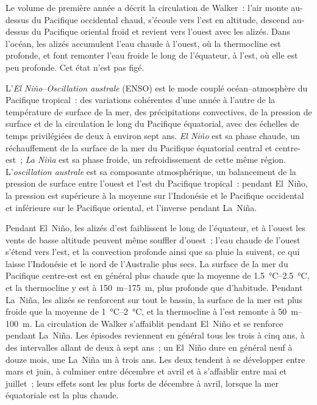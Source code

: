 Le volume de première année a décrit la circulation de Walker~: l'air monte au-dessus du Pacifique occidental
chaud, s'écoule vers l'est en altitude, descend au-dessus du Pacifique oriental froid et revient vers l'ouest
avec les alizés. Dans l'océan, les alizés accumulent l'eau chaude à l'ouest, où la thermocline est profonde,
et font remonter l'eau froide le long de l'équateur, à l'est, où elle est peu profonde.
Cet état n'est pas figé.

\begin{definition}\label{def:b2:climate-variability:enso}
L'\emph{El Niño--Oscillation australe} (ENSO) est le mode couplé océan--atmosphère
du Pacifique tropical~: des variations cohérentes d'une année à l'autre de la température de surface de la mer,
des précipitations convectives, de la pression de surface et de la circulation le long
du Pacifique équatorial, avec des échelles de temps privilégiées de deux à environ sept ans.
\emph{El Niño} est sa phase chaude, un réchauffement de la surface de la mer du Pacifique
équatorial central et centre-est~; \emph{La Niña} est sa phase froide, un refroidissement
de cette même région. L'\emph{oscillation australe} est sa composante atmosphérique,
un balancement de la pression de surface entre l'ouest et l'est du Pacifique tropical~: pendant El~Niño,
la pression est supérieure à la moyenne sur l'Indonésie et le Pacifique occidental et inférieure
sur le Pacifique oriental, et l'inverse pendant La~Niña.
\end{definition}

Pendant El~Niño, les alizés d'est faiblissent le long de l'équateur, et à l'ouest les vents de basse altitude peuvent
même souffler d'ouest~; l'eau chaude de l'ouest s'étend vers l'est, et la convection profonde ainsi que sa pluie la suivent,
ce qui laisse l'Indonésie et le nord de l'Australie plus secs.
La surface de la mer du Pacifique centre-est est en général plus chaude que la moyenne de \qtyrange{1.5}{2.5}{\celsius},
et la thermocline y est à \qtyrange{150}{175}{m}, plus profonde que d'habitude.
Pendant La~Niña, les alizés se renforcent sur tout le bassin,
la surface de la mer est plus froide que la moyenne de \qtyrange{1}{2}{\celsius}, et la thermocline à l'est remonte à
\qtyrange{50}{100}{m}. La circulation de Walker s'affaiblit pendant El~Niño et se renforce pendant La~Niña. Les épisodes
reviennent en général tous les trois à cinq ans, à des intervalles allant de deux à sept ans~; un El~Niño dure en général
neuf à douze mois, une La~Niña un à trois ans. Les deux tendent à se développer entre mars et juin, à culminer entre
décembre et avril et à s'affaiblir entre mai et juillet~; leurs effets sont les plus forts de décembre à avril, lorsque la
mer équatoriale est la plus chaude.

